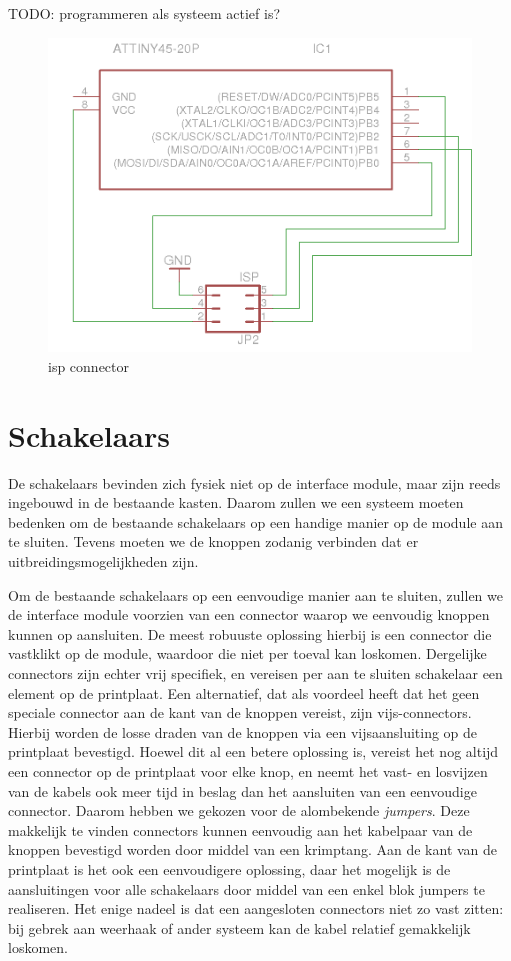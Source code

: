 \documentclass[verslag.tex]{subfiles}
\begin{document}
TODO: programmeren als systeem actief is?

\begin{figure}
	\includegraphics[width=\textwidth]{afbeeldingen/circuit_isp}
	\caption{\acs{isp} connector}
\end{figure}

\section{Schakelaars}

De schakelaars bevinden zich fysiek niet op de interface module, maar zijn reeds ingebouwd in de bestaande kasten. Daarom zullen we een systeem moeten bedenken om de bestaande schakelaars op een handige manier op de module aan te sluiten. Tevens moeten we de knoppen zodanig verbinden dat er uitbreidingsmogelijkheden zijn.

Om de bestaande schakelaars op een eenvoudige manier aan te sluiten, zullen we de interface module voorzien van een connector waarop we eenvoudig knoppen kunnen op aansluiten. De meest robuuste oplossing hierbij is een connector die vastklikt op de module, waardoor die niet per toeval kan loskomen. Dergelijke connectors zijn echter vrij specifiek, en vereisen per aan te sluiten schakelaar een element op de printplaat. Een alternatief, dat als voordeel heeft dat het geen speciale connector aan de kant van de knoppen vereist, zijn vijs-connectors. Hierbij worden de losse draden van de knoppen via een vijsaansluiting op de printplaat bevestigd. Hoewel dit al een betere oplossing is, vereist het nog altijd een connector op de printplaat voor elke knop, en neemt het vast- en losvijzen van de kabels ook meer tijd in beslag dan het aansluiten van een eenvoudige connector. Daarom hebben we gekozen voor de alombekende \emph{jumpers}. Deze makkelijk te vinden connectors kunnen eenvoudig aan het kabelpaar van de knoppen bevestigd worden door middel van een krimptang. Aan de kant van de printplaat is het ook een eenvoudigere oplossing, daar het mogelijk is de aansluitingen voor alle schakelaars door middel van een enkel blok jumpers te realiseren. Het enige nadeel is dat een aangesloten connectors niet zo vast zitten: bij gebrek aan weerhaak of ander systeem kan de kabel relatief gemakkelijk loskomen.
\end{document}
